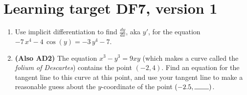 \section{Learning target DF7, version 1}
\providecommand{\stxKnowl}{}\renewcommand{\stxKnowl}[1]{#1}
\providecommand{\stxOuttro}{}\renewcommand{\stxOuttro}[1]{#1}
\providecommand{\stxTitle}{}\renewcommand{\stxTitle}[1]{#1}
\renewcommand{\stxOuttro}[1]{}
\stxKnowl{

\begin{enumerate}
\item
\stxKnowl{
Use implicit differentiation to find \(\frac{dy}{dx}\), aka \(y'\), for the equation \(-7 \, x^{4} - 4 \, \cos\left(y\right) = -3 \, y^{4} - 7\).

\stxOuttro{
\[\frac{dy}{dx}=\frac{7 \, x^{3}}{3 \, y^{3} + \sin\left(y\right)}\]

}
}
\vfill
\item
\stxKnowl{
\textbf{(Also AD2)}
The equation \(x^{3}-y^{3}=9xy\) (which makes a curve called the \textit{folium of Descartes}) contains the point \((-2, 4)\). Find an equation for the tangent line to this curve at this point, and use your tangent line to make a reasonable guess about the $y$-coordinate of the point $(-2.5, \rule{0.75cm}{0.15mm} )$.

\stxOuttro{
\(\frac{dy}{dx}=\dfrac{3x^2-9y}{9x+3y^2}\), so the slope at \((-2,4)\) is \(-0.8\), and the equation of the tangent line is \(L(x) = -0.8(x+2) +4\). Since \(L(-2.5) = 4.4\), the point \((-2.5, 4.4)\) is pretty close to being on the original function.

}
}
\vfill
\end{enumerate}
}

\pagebreak

